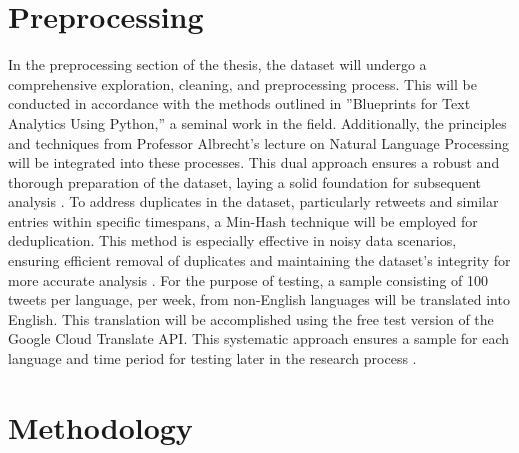 \documentclass[
    11pt,
    a4paper,
    egregdoesnotlikesansseriftitles,
    toc=chapterentrywithdots,
    oneside,openright,
    titlepage,
    parskip=half,
    headings=normal,  %
    listof=totoc,
    bibliography=totoc,
    index=totoc,
    captions=tableheading,  %
    chapterprefix,
    listof=flat,
    final
]{scrbook}
\begin{document}
{\let\clearpage\relax \chapter{Preprocessing}}
In the preprocessing section of the thesis, the dataset will undergo a comprehensive exploration, cleaning, and preprocessing process. This will be conducted in accordance with the methods outlined in ''Blueprints for Text Analytics Using Python,'' a seminal work in the field. Additionally, the principles and techniques from Professor Albrecht's lecture on Natural Language Processing will be integrated into these processes. This dual approach ensures a robust and thorough preparation of the dataset, laying a solid foundation for subsequent analysis \cite{Albrecht}.
To address duplicates in the dataset, particularly retweets and similar entries within specific timespans, a Min-Hash technique will be employed for deduplication. This method is especially effective in noisy data scenarios, ensuring efficient removal of duplicates and maintaining the dataset's integrity for more accurate analysis \cite{Dedupl}.
For the purpose of testing, a sample consisting of 100 tweets per language, per week, from non-English languages will be translated into English. This translation will be accomplished using the free test version of the Google Cloud Translate API. This systematic approach ensures a sample for each language and time period for testing later in the research process \cite{GoogleTranslateApi}.

{\let\clearpage\relax \chapter{Methodology}}
\end{document}
